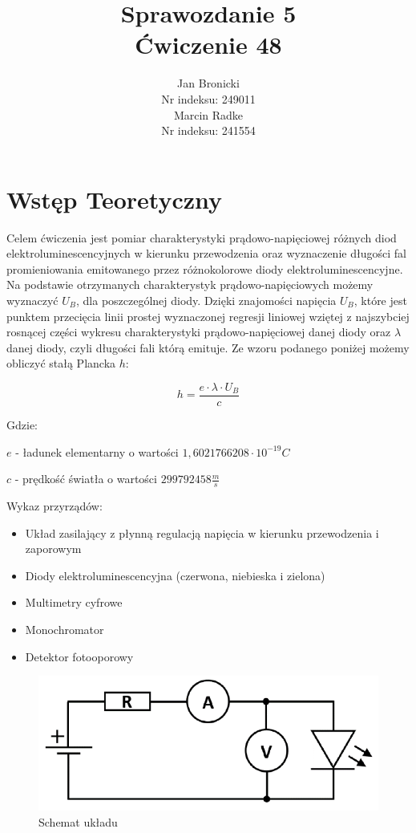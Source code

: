 \documentclass{article}
\title{Sprawozdanie 5\\ Ćwiczenie 48}
\author{Jan Bronicki \\
Nr indeksu: 249011\\
Marcin Radke\\
Nr indeksu: 241554}
\date{}
\begin{document}
\maketitle

\section{Wstęp Teoretyczny}
\par Celem ćwiczenia jest pomiar charakterystyki prądowo-napięciowej różnych diod elektroluminescencyjnych w kierunku przewodzenia oraz wyznaczenie długości fal promieniowania emitowanego przez różnokolorowe diody elektroluminescencyjne.
Na podstawie otrzymanych charakterystyk prądowo-napięciowych możemy wyznaczyć $U_{B}$, dla poszczególnej diody. Dzięki znajomości napięcia $U_{B}$, które jest punktem przecięcia linii prostej wyznaczonej regresji liniowej wziętej z najszybciej rosnącej części wykresu charakterystyki prądowo-napięciowej danej diody oraz $\lambda$ danej diody, czyli długości fali którą emituje. Ze wzoru podanego poniżej możemy obliczyć stałą Plancka $h$:
\vspace{-3ex}
\begin{center}
    $$
    h=\frac{e\cdot \lambda \cdot U_{B}}{c}
    $$
\end{center}
Gdzie:
\par $e$ - ładunek elementarny o wartości $1,6021766208\cdot 10^{−19} C$
\vspace{1.5ex}
\par $c$ - prędkość światła o wartości $ 299 792 458 \frac{m}{s}$\\
\vspace{-2ex}
\begin{flushleft}

Wykaz przyrządów:
\end{flushleft}
\begin{itemize}
    \item Układ zasilający z płynną regulacją napięcia w kierunku przewodzenia i zaporowym
    \item Diody elektroluminescencyjna (czerwona, niebieska i zielona)
    \item Multimetry cyfrowe
    \item Monochromator
    \item Detektor fotooporowy
\end{itemize}


\begin{figure}[h!]
    \centering
    \includegraphics[scale=0.65]{Schemat.PNG}
    \caption{Schemat układu}
\end{figure}
\end{document}
